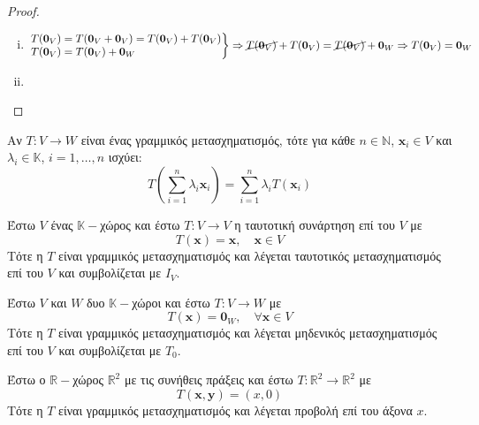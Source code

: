 \begin{proof}
\item 
  \begin{enumerate}[i)]
    \item 
      $ 
      \left.
        \begin{matrix*}[l]
          T(\mathbf{0}_{V}) = T(\mathbf{0}_{V}+ \mathbf{0}_{V}) = 
          T(\mathbf{0}_{V}) + T(\mathbf{0}_{V})  \\ 
          T(\mathbf{0}_{V}) = T(\mathbf{0}_{V}) + \mathbf{0}_{W}
        \end{matrix*} 
      \right\}
      \Rightarrow \cancel{T(\mathbf{0}_{V})} + T(\mathbf{0}_{V}) =
      \cancel{T(\mathbf{0}_{V})} + \mathbf{0}_{W} \Rightarrow  
      T(\mathbf{0}_{V}) = \mathbf{0}_{W} $
    \item 
  \end{enumerate}
\end{proof}

\begin{rem}
  Αν $ T \colon V \to W $ είναι ένας γραμμικός μετασχηματισμός, τότε για κάθε 
  $ n \in \mathbb{N} $, $ \mathbf{x}_{i} \in V $ και $ \lambda _{i} \in \mathbb{K} $, 
  $ i = 1,\ldots, n $ ισχύει:
  \[
    T\left(\sum_{i=1}^{n} \lambda _{i} \mathbf{x}_{i}\right) = \sum_{i=1}^{n} 
    \lambda _{i} T(\mathbf{x}_{i}) 
  \] 
\end{rem}

\begin{example}[Ταυτοτικός]
  Έστω $V$ ένας $ \mathbb{K} - $χώρος και έστω $ T \colon V \to V $ η ταυτοτική 
  συνάρτηση επί του $V$ με 
  \[
    T(\mathbf{x}) = \mathbf{x}, \quad \mathbf{x} \in V   
  \]
  Τότε η $T$ είναι γραμμικός μετασχηματισμός και λέγεται 
  \textcolor{Col1}{ταυτοτικός} μετασχηματισμός επί του $V$ και συμβολίζεται με $ I_{V} $.
\end{example}

\begin{example}[Μηδενικός]
  Έστω $V$ και $W$ δυο $ \mathbb{K}- $χώροι και έστω $ T \colon V \to W $ με 
  \[
    T(\mathbf{x}) = \mathbf{0}_{W}, \quad \forall \mathbf{x} \in V
  \]
  Τότε η $T$ είναι γραμμικός μετασχηματισμός και λέγεται 
  \textcolor{Col1}{μηδενικός} μετασχηματισμός επί του $V$ και συμβολίζεται με $ T_{0} $.
\end{example}

\begin{example}
  Έστω ο $ \mathbb{R}- $χώρος $ \mathbb{R}^{2} $ με τις συνήθεις πράξεις και έστω 
  $ T \colon \mathbb{R}^{2} \to \mathbb{R}^{2} $ με 
  \[
    T(\mathbf{x}, \mathbf{y}) = (x, 0) 
  \] 
  Τότε η $T$ είναι γραμμικός μετασχηματισμός και λέγεται \textcolor{Col1}{προβολή} επί 
  του άξονα $x$.
\end{example}

